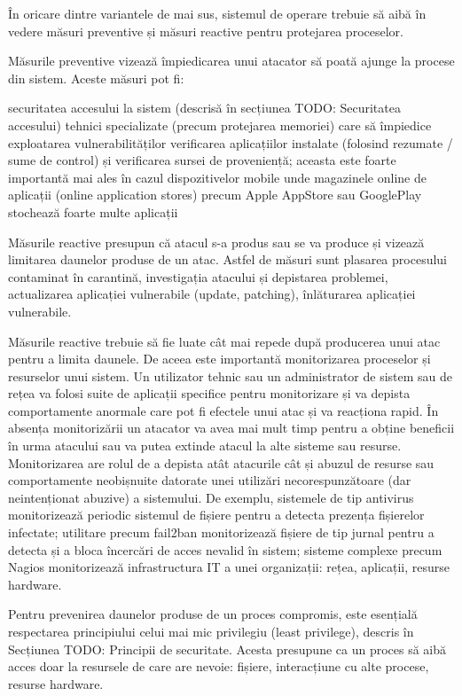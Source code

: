 În oricare dintre variantele de mai sus, sistemul de operare trebuie să aibă în vedere măsuri preventive și măsuri reactive pentru protejarea proceselor.

Măsurile preventive vizează împiedicarea unui atacator să poată ajunge la procese din sistem. Aceste măsuri pot fi:

securitatea accesului la sistem (descrisă în secțiunea TODO: Securitatea accesului)
tehnici specializate (precum protejarea memoriei) care să împiedice exploatarea vulnerabilităților
verificarea aplicațiilor instalate (folosind rezumate / sume de control) și verificarea sursei de proveniență; aceasta este foarte importantă mai ales în cazul dispozitivelor mobile unde magazinele online de aplicații (online application stores) precum Apple AppStore sau GooglePlay stochează foarte multe aplicații

Măsurile reactive presupun că atacul s-a produs sau se va produce și vizează limitarea daunelor produse de un atac. Astfel de măsuri sunt plasarea procesului contaminat în carantină, investigația atacului și depistarea problemei, actualizarea aplicației vulnerabile (update, patching), înlăturarea aplicației vulnerabile.

Măsurile reactive trebuie să fie luate cât mai repede după producerea unui atac pentru a limita daunele. De aceea este importantă monitorizarea proceselor și resurselor unui sistem. Un utilizator tehnic sau un administrator de sistem sau de rețea va folosi suite de aplicații specifice pentru monitorizare și va depista comportamente anormale care pot fi efectele unui atac și va reacționa rapid. În absența monitorizării un atacator va avea mai mult timp pentru a obține beneficii în urma atacului sau va putea extinde atacul la alte sisteme sau resurse. Monitorizarea are rolul de a depista atât atacurile cât și abuzul de resurse sau comportamente neobișnuite datorate unei utilizări necorespunzătoare (dar neintenționat abuzive) a sistemului. De exemplu, sistemele de tip antivirus monitorizează periodic sistemul de fișiere pentru a detecta prezența fișierelor infectate; utilitare precum fail2ban monitorizează fișiere de tip jurnal pentru a detecta și a bloca încercări de acces nevalid în sistem; sisteme complexe precum Nagios monitorizează infrastructura IT a unei organizații: rețea, aplicații, resurse hardware.

Pentru prevenirea daunelor produse de un proces compromis, este esențială respectarea principiului celui mai mic privilegiu (least privilege), descris în Secțiunea TODO: Principii de securitate. Acesta presupune ca un proces să aibă acces doar la resursele de care are nevoie: fișiere, interacțiune cu alte procese, resurse hardware.

